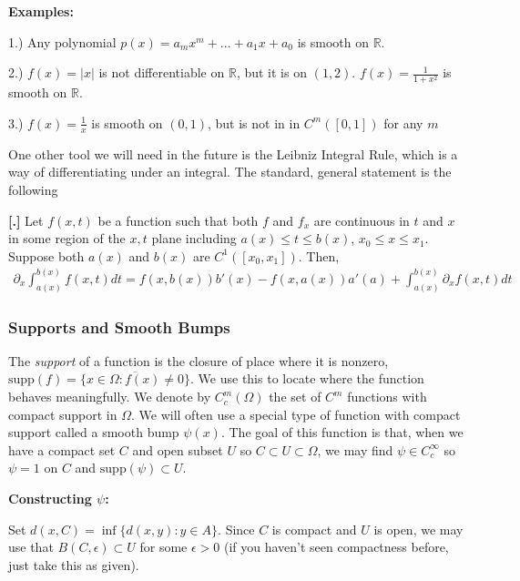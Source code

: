 \documentclass{article}
\newcommand{\R}{{\mathbb{R}}}
\newcommand{\cl}[1]{{\overline{#1}}}
\newcommand{\pd}{\partial}
\newcommand{\supp}{\text{supp}}
\newcounter{result}[section]
\newenvironment{res}[1][]{\refstepcounter{result}\par\medskip
	\noindent \textbf{[\thesection.\theresult] #1} \rmfamily}{\medskip}
\begin{document}
	\vspace{0.25 cm}
	
	\textbf{Examples:}
	
	1.) Any polynomial $p(x) = a_{m}x^{m} + ... + a_1 x + a_0$ is smooth on $\R$. 
	
	2.) $f(x) = |x|$ is not differentiable on $\R$, but it is on $(1,2)$. $f(x) = \frac{1}{1+x^2}$ is smooth on $\R$.
	
	3.) $f(x) = \frac{1}{x}$ is smooth on $(0,1)$, but is not in in $C^{m}([0,1])$ for any $m$
	
	\vspace{0.25 cm}
	
	One other tool we will need in the future is the Leibniz Integral Rule, which is a way of differentiating under an integral. The standard, general statement is the following
	
	\begin{res}
		Let $f(x,t)$ be a function such that both $f$ and $f_{x}$ are continuous in $t$ and $x$ in some region of the $x,t$ plane including $a(x) \leq t \leq b(x)$, $x_0 \leq x \leq x_1$. Suppose both $a(x)$ and $b(x)$ are $C^{1}([x_0,x_1])$. Then,
		\begin{align*}
			\pd_{x} \int_{a(x)}^{b(x)} f(x,t) dt = f(x,b(x))b'(x) - f(x,a(x))a'(a) + \int_{a(x)}^{b(x)} \pd_{x} f(x,t) dt
		\end{align*} 
	\end{res}
	
	
	\subsubsection{Supports and Smooth Bumps}
	
	The \textit{support} of a function is the closure of place where it is nonzero, $\supp(f) = \cl{\{x \in \Omega : f(x) \neq 0\}}$. We use this to locate where the function behaves meaningfully. We denote by $C_{c}^{m}(\Omega)$ the set of $C^{m}$ functions with compact support in $\Omega$. We will often use a special type of function with compact support called a smooth bump $\psi(x)$. The goal of this function is that, when we have a compact set $C$ and open subset $U$ so $C \subset U \subset \Omega$, we may find $\psi \in C_{c}^{\infty}$ so $\psi = 1$ on $C$ and $\supp(\psi) \subset U$.  
		
	\vspace{0.25 cm}
		
	\textbf{Constructing $\psi$:}
	
	Set $d(x,C) = \inf\{ d(x,y) : y \in A \}$. Since $C$ is compact and $U$ is open, we may use that $B(C,\epsilon) \subset U$ for some $\epsilon >0$ (if you haven't seen compactness before, just take this as given). 
	
\end{document}

